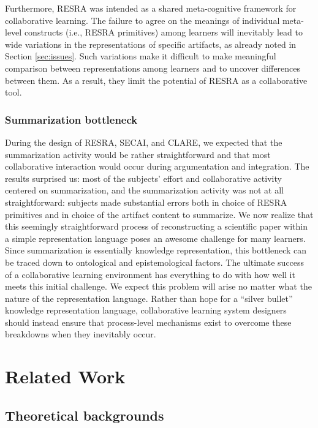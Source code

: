 Furthermore, RESRA was intended as a shared meta-cognitive framework for
collaborative learning. The failure to agree on the meanings of individual
meta-level constructs (i.e., RESRA primitives) among learners will
inevitably lead to wide variations in the representations of specific
artifacts, as already noted in Section \ref{sec:issues}. Such variations
make it difficult to make meaningful comparison between representations
among learners and to uncover differences between them. As a result, they
limit the potential of RESRA as a collaborative tool.


\subsubsection{Summarization bottleneck}

During the design of RESRA, SECAI, and CLARE, we expected that the
summarization activity would be rather straightforward and that most
collaborative interaction would occur during argumentation and integration.
The results surprised us: most of the subjects' effort and collaborative
activity centered on summarization, and the summarization activity was not
at all straightforward: subjects made substantial errors both in choice of
RESRA primitives and in choice of the artifact content to summarize.  We
now realize that this seemingly straightforward process of reconstructing a
scientific paper within a simple representation language poses an awesome
challenge for many learners. Since summarization is essentially knowledge
representation, this bottleneck can be traced down to ontological and
epistemological factors. The ultimate success of a collaborative learning
environment has everything to do with how well it meets this initial
challenge. We expect this problem will arise no matter what the nature of
the representation language. Rather than hope for a ``silver bullet''
knowledge representation language, collaborative learning system designers
should instead ensure that process-level mechanisms exist to overcome these
breakdowns when they inevitably occur.


\section{Related Work}
\label{sec:related work}

\subsection{Theoretical backgrounds}

